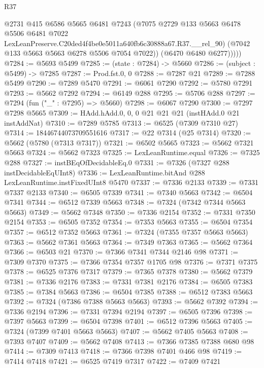 \begin{lexlean}{R37}
\begin{coremodule}
              @2731
              @415
              @6586
              @5665
              @6481
              @7243
              (@7075
                @2729
                @133
                @5663
                @6478
                @5506
                @6481
                @7022
                LexLeanPreserve.C20ded4f4be0e5011a640fb6c30888a67.R37.__rel_90)
              (@7042 @133 @5663 @5663 @6278 @5506 @7054 @7022))
            (@6470 @6480 @6277)))))
@7284 := @5693 @5499
@7285 := (state : @7284) -> @5660
@7286 := (subject : @5499) -> @7285
@7287 := Prod.fst.{0, 0}
@7288 := @7287 @21
@7289 := @7288 @5499
@7290 := @7289 @5470
@7291 := @6061 @7290
@7292 := @5780 @7291
@7293 := @5662 @7292
@7294 := @6149 @288
@7295 := @5706 @288
@7297 := @7294 (fun ("_" : @7295) => @5660)
@7298 := @6067 @7290
@7300 := @7297 @7298 @5665
@7309 := HAdd.hAdd.{0, 0, 0} @21 @21 @21 (instHAdd.{0} @21 instAddNat)
@7310 := @7289 @5785
@7313 := @6525 (@7309 @7310 @27)
@7314 := 18446744073709551616
@7317 := @22 @7314 (@25 @7314)
@7320 := @5662 (@5780 (@7313 @7317))
@7321 := @6502 @5665
@7323 := @5662 @7321 @5663
@7324 := @5662 @7323
@7325 := LexLeanRuntime.equal
@7326 := @7325 @288
@7327 := instBEqOfDecidableEq.{0}
@7331 := @7326 (@7327 @288 instDecidableEqUInt8)
@7336 := LexLeanRuntime.bitAnd @288 LexLeanRuntime.instFixedUInt8 @5470
@7337 := @7336 @2133
@7339 := @7331 @7337 @2133
@7340 := @6505 @7339
@7341 := @7340 @5663
@7342 := @6504 @7341
@7344 := @6512 @7339 @5663
@7348 := @7324 (@7342 @7344 @5663 @5663)
@7349 := @5662 @7348
@7350 := @7336 @2154
@7352 := @7331 @7350 @2154
@7353 := @6505 @7352
@7354 := @7353 @5663
@7355 := @6504 @7354
@7357 := @6512 @7352 @5663
@7361 := @7324 (@7355 @7357 @5663 @5663)
@7363 := @5662 @7361 @5663
@7364 := @7349 @7363
@7365 := @5662 @7364
@7366 := @6503 @21
@7370 := @7366 @7341 @7344 @2146 @98
@7371 := @7309 @7370
@7375 := @7366 @7354 @7357 @1705 @98
@7376 := @7371 @7375
@7378 := @6525 @7376 @7317
@7379 := @7365 @7378
@7380 := @5662 @7379
@7381 := @7336 @2176
@7383 := @7331 @7381 @2176
@7384 := @6505 @7383
@7385 := @7384 @5663
@7386 := @6504 @7385
@7388 := @6512 @7383 @5663
@7392 := @7324 (@7386 @7388 @5663 @5663)
@7393 := @5662 @7392
@7394 := @7336 @2194
@7396 := @7331 @7394 @2194
@7397 := @6505 @7396
@7398 := @7397 @5663
@7399 := @6504 @7398
@7401 := @6512 @7396 @5663
@7405 := @7324 (@7399 @7401 @5663 @5663)
@7407 := @5662 @7405 @5663
@7408 := @7393 @7407
@7409 := @5662 @7408
@7413 := @7366 @7385 @7388 @680 @98
@7414 := @7309 @7413
@7418 := @7366 @7398 @7401 @466 @98
@7419 := @7414 @7418
@7421 := @6525 @7419 @7317
@7422 := @7409 @7421

\end{coremodule}
\end{lexlean}
